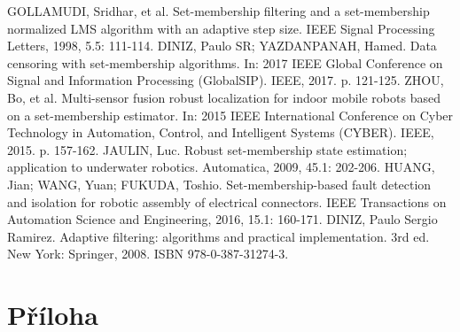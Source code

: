 \documentclass[11pt,twoside,openright]{report}
\begin{document}
\begin{thebibliography}{L}
GOLLAMUDI, Sridhar, et al. Set-membership filtering and a set-membership normalized LMS algorithm with an adaptive step size. IEEE Signal Processing Letters, 1998, 5.5: 111-114.
DINIZ, Paulo SR; YAZDANPANAH, Hamed. Data censoring with set-membership algorithms. In: 2017 IEEE Global Conference on Signal and Information Processing (GlobalSIP). IEEE, 2017. p. 121-125.
ZHOU, Bo, et al. Multi-sensor fusion robust localization for indoor mobile robots based on a set-membership estimator. In: 2015 IEEE International Conference on Cyber Technology in Automation, Control, and Intelligent Systems (CYBER). IEEE, 2015. p. 157-162.
JAULIN, Luc. Robust set-membership state estimation; application to underwater robotics. Automatica, 2009, 45.1: 202-206.
HUANG, Jian; WANG, Yuan; FUKUDA, Toshio. Set-membership-based fault detection and isolation for robotic assembly of electrical connectors. IEEE Transactions on Automation Science and Engineering, 2016, 15.1: 160-171.
DINIZ, Paulo Sergio Ramirez. Adaptive filtering: algorithms and practical implementation. 3rd ed. New York: Springer, 2008. ISBN 978-0-387-31274-3.
\end{thebibliography}



\clearpage
\chapter*{Příloha}
\begin{appendices}

\end{appendices}
\end{document}
